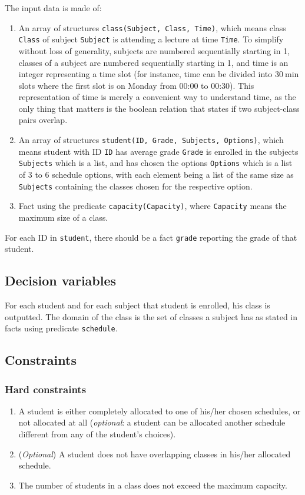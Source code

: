 \documentclass[runningheads]{llncs}
\begin{document}
The input data is made of:
\begin{enumerate}
    \item An array of structures \texttt{class(Subject, Class, Time)}, which means class \texttt{Class} of subject \texttt{Subject} is attending a lecture at time \texttt{Time}. To simplify without loss of generality, subjects are numbered sequentially starting in 1, classes of a subject are numbered sequentially starting in 1, and time is an integer representing a time slot (for instance, time can be divided into $\SI{30}{\minute}$ slots where the first slot is on Monday from 00:00 to 00:30). This representation of time is merely a convenient way to understand time, as the only thing that matters is the boolean relation that states if two subject-class pairs overlap.
    \item An array of structures \texttt{student(ID, Grade, Subjects, Options)}, which means student with ID \texttt{ID} has average grade \texttt{Grade} is enrolled in the subjects \texttt{Subjects} which is a list, and has chosen the options  \texttt{Options} which is a list of 3 to 6 schedule options, with each element being a list of the same size as \texttt{Subjects} containing the classes chosen for the respective option.
    \item Fact using the predicate \texttt{capacity(Capacity)}, where \texttt{Capacity} means the maximum size of a class.
\end{enumerate}

For each ID in \texttt{student}, there should be a fact \texttt{grade} reporting the grade of that student.

\subsection{Decision variables}

For each student and for each subject that student is enrolled, his class is outputted. The domain of the class is the set of classes a subject has as stated in facts using predicate \texttt{schedule}.

\subsection{Constraints}

\subsubsection{Hard constraints}
\begin{enumerate}
    \item A student is either completely allocated to one of his/her chosen schedules, or not allocated at all (\textit{optional}: a student can be allocated another schedule different from any of the student's choices).
    \item (\textit{Optional}) A student does not have overlapping classes in his/her allocated schedule.
    \item The number of students in a class does not exceed the maximum capacity.
\end{enumerate}
\end{document}
